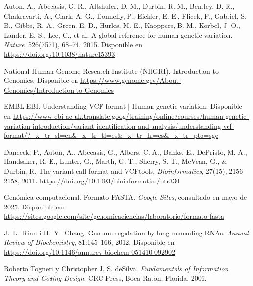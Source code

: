 \documentclass[11pt,spanish,listoffigures,listoftables]{tfgetsinf}
\begin{document}
\begin{thebibliography}{99}
   Auton, A., Abecasis, G. R., Altshuler, D. M., Durbin, R. M., Bentley, D. R., Chakravarti, A., Clark, A. G., Donnelly, P., Eichler, E. E., Flicek, P., Gabriel, S. B., Gibbs, R. A., Green, E. D., Hurles, M. E., Knoppers, B. M., Korbel, J. O., Lander, E. S., Lee, C., et al.  
   \newblock A global reference for human genetic variation.  
   \newblock \textit{Nature}, 526(7571), 68–74, 2015.  
   \newblock Disponible en 
   \newblock \url{https://doi.org/10.1038/nature15393}
   
   National Human Genome Research Institute (NHGRI).  
   \newblock Introduction to Genomics.  
   \newblock Disponible en  
   \newblock \url{https://www.genome.gov/About-Genomics/Introduction-to-Genomics}


   EMBL-EBI.  
   \newblock Understanding VCF format | Human genetic variation.  
   \newblock Disponible en 
   \newblock \url{https://www-ebi-ac-uk.translate.goog/training/online/courses/human-genetic-variation-introduction/variant-identification-and-analysis/understanding-vcf-format/?_x_tr_sl=en&_x_tr_tl=es&_x_tr_hl=es&_x_tr_pto=sge}
   
   Danecek, P., Auton, A., Abecasis, G., Albers, C. A., Banks, E., DePristo, M. A., Handsaker, R. E., Lunter, G., Marth, G. T., Sherry, S. T., McVean, G., \& Durbin, R.  
   \newblock The variant call format and VCFtools.  
   \newblock \textit{Bioinformatics}, 27(15), 2156–2158, 2011.  
   \newblock \url{https://doi.org/10.1093/bioinformatics/btr330}

   Genómica computacional.  
   \newblock Formato FASTA.  
   \newblock \textit{Google Sites}, consultado en mayo de 2025.  
   \newblock Disponible en: \url{https://sites.google.com/site/genomicaciencias/laboratorio/formato-fasta}

   J.~L.~Rinn i H.~Y.~Chang.
   \newblock Genome regulation by long noncoding RNAs.
   \newblock \textit{Annual Review of Biochemistry}, 81:145--166, 2012.
   \newblock Disponible en
   \newblock \url{https://doi.org/10.1146/annurev-biochem-051410-092902}

   Roberto Togneri y Christopher J. S. deSilva.  
   \newblock \textit{Fundamentals of Information Theory and Coding Design}.  
   \newblock CRC Press, Boca Raton, Florida, 2006.
   

\end{thebibliography}
\cleardoublepage

\end{document}
